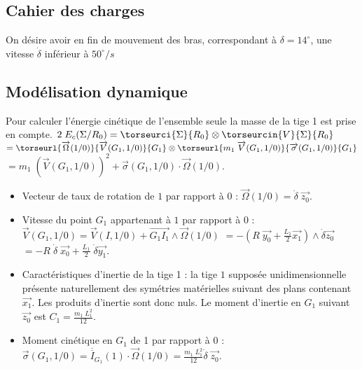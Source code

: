 \begin{multicols}{2}
\fi
\subsection*{Cahier des charges}

\ifprof
\else
On désire avoir en fin de mouvement des bras, correspondant à $\delta=14^{\circ}$, une vitesse $\dot{\delta}$ inférieur à $50^{\circ}/s$
\fi
\subsection*{Modélisation dynamique}

\ifprof
\begin{corrige}
Pour calculer l'énergie cinétique de l'ensemble seule la masse de la tige 1 est prise en compte.
$
2\;E_c(\Sigma/R_0)=\torseurci{\Sigma}{R_0}\otimes \torseurcin{V}{\Sigma}{R_0}$
$=\torseurl{\overrightarrow{\Omega}(1/0)}{\overrightarrow{V}(G_1,1/0)}{G_1}\otimes \torseurl{m_1\;\overrightarrow{V}(G_1,1/0)}{\overrightarrow{\sigma}(G_1,1/0)}{G_1}$
$=m_1\;\left(\overrightarrow{V}(G_1,1/0)\right)^2+\overrightarrow{\sigma}(G_1,1/0)\cdot \overrightarrow{\Omega}(1/0). 
$

\begin{itemize}
\item Vecteur de taux de rotation de $1$ par rapport à $0$ : $
\overrightarrow{\Omega}(1/0)=\dot{\delta}\;\overrightarrow{z_0}.
$

\item Vitesse du point $G_1$ appartenant à $1$ par rapport à $0$ : $
\overrightarrow{V}(G_1,1/0)=\overrightarrow{V}(I,1/0)+\overrightarrow{G_1I_1}\wedge\overrightarrow{\Omega}(1/0)$
$=-\left(R\;\overrightarrow{y_0}+\frac{L_1}{2}\overrightarrow{x_1}\right)\wedge\dot{\delta}\overrightarrow{z_0}$
$=-R\;\dot{\delta}\;\overrightarrow{x_0}+\frac{L_1}{2}\;\dot{\delta}\overrightarrow{y_1}$.


\item Caractéristiques d'inertie de la tige 1 : la tige $1$ supposée unidimensionnelle présente naturellement des symétries matérielles suivant des plans contenant $\overrightarrow{x_1}$. Les produits d'inertie sont donc nuls. Le moment d'inertie en $G_1$ suivant $\overrightarrow{z_0}$ est $C_1=\frac{m_1\;L_1^2}{12}$.

\item Moment cinétique en $G_1$ de 1 par rapport à 0 : $
\overrightarrow{\sigma}(G_1,1/0)=\overline{\overline{I}}_{G_1}(1)\cdot \overrightarrow{\Omega}(1/0)=\frac{m_1\;L_1^2}{12}\dot{\delta}\;\overrightarrow{z_0}
$.


\end{itemize}
\end{corrige}
\end{multicols}
